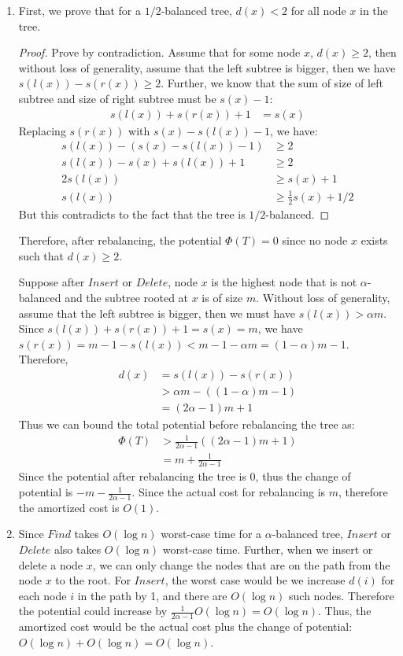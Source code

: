 \documentclass[11pt]{article}
\begin{document}
\begin{enumerate}
\begin{enumerate}
\item %
First, we prove that for a $1/2$-balanced tree, $d(x) < 2$ for all
node $x$ in the tree.
\begin{proof}
  Prove by contradiction. Assume that for some node $x$, $d(x) \geq
  2$, then without loss of generality, assume that the left subtree is
  bigger, then we have $s(l(x)) - s(r(x)) \geq 2$. Further, we know
  that the sum of size of left subtree and size of right subtree must
  be $s(x)-1$:
  \begin{align}
    s(l(x)) + s(r(x)) + 1 &= s(x)
  \end{align}
  Replacing $s(r(x))$ with $s(x)-s(l(x))-1$, we have:
  \begin{align}
    s(l(x)) - (s(x)-s(l(x))-1) &\geq 2\\
    s(l(x)) - s(x) + s(l(x)) + 1 &\geq 2\\
    2s(l(x)) &\geq s(x) + 1\\
    s(l(x)) &\geq \frac{1}{2}s(x) + 1/2
  \end{align}
  But this contradicts to the fact that the tree is $1/2$-balanced.
\end{proof}
Therefore, after rebalancing, the potential $\Phi(T)=0$ since no node
$x$ exists such that $d(x) \geq 2$.

Suppose after $Insert$ or $Delete$, node $x$ is the highest node that
is not $\alpha$-balanced and the subtree rooted at $x$ is of size
$m$. Without loss of generality, assume that the left subtree is
bigger, then we must have $s(l(x)) > \alpha m$. Since $s(l(x)) +
s(r(x)) + 1 = s(x) = m$, we have $s(r(x)) = m - 1 - s(l(x)) <
m-1-\alpha m = (1-\alpha)m - 1$. Therefore,
\begin{align}
  d(x) &= s(l(x)) - s(r(x))\\
  &> \alpha m - ((1-\alpha)m - 1)\\
  &= (2\alpha - 1)m + 1
\end{align}
Thus we can bound the total potential before rebalancing the tree as:
\begin{align}
  \Phi(T) &> \frac{1}{2\alpha - 1} ((2\alpha - 1)m + 1)\\
  &= m + \frac{1}{2\alpha - 1}
\end{align}
Since the potential after rebalancing the tree is 0, thus the change
of potential is $-m - \frac{1}{2\alpha - 1}$. Since the actual cost
for rebalancing is $m$, therefore the amortized cost is $O(1)$.

\item %
  Since $Find$ takes $O(\log n)$ worst-case time for a
  $\alpha$-balanced tree, $Insert$ or $Delete$ also takes $O(\log n)$
  worst-case time. Further, when we insert or delete a node $x$, we
  can only change the nodes that are on the path from the node $x$ to
  the root. For $Insert$, the worst case would be we increase $d(i)$
  for each node $i$ in the path by 1, and there are $O(\log n)$ such
  nodes. Therefore the potential could increase by $\frac{1}{2\alpha -
    1}O(\log n) = O(\log n)$. Thus, the amortized cost would be the
  actual cost plus the change of potential: $O(\log n) + O(\log n) =
  O(\log n)$.


\end{enumerate}
\end{enumerate}
\end{document}
